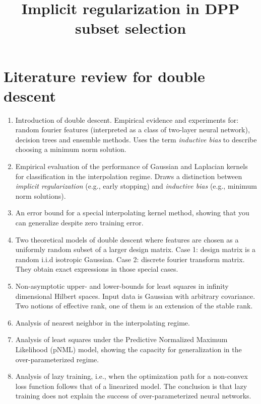 \documentclass[12pt]{sty/colt2019/colt2018-arxiv}
\title{Implicit regularization in DPP subset selection}
\begin{document}
\maketitle

\section{Literature review for double descent}

\begin{enumerate}
\item \citet*{BHMM19} Introduction of double descent. Empirical evidence and
experiments for: random fourier features (interpreted as a class of
two-layer neural network), decision trees and ensemble
methods. Uses the term \emph{inductive bias} to describe choosing a
minimum norm solution.

\item\citet*{BMM18_TR}
Empirical evaluation of the performance of Gaussian and Laplacian
kernels for classification in the interpolation regime. Draws a distinction between
\emph{implicit regularization} (e.g., early stopping) and
\emph{inductive bias} (e.g., minimum norm solutions).

\item\citet*{BRT18_TR}
An error bound for a special interpolating kernel
method, showing that you can generalize despite zero training error.

\item\citet*{belkin2019two} Two theoretical models of double
  descent where features are chosen as a uniformly random subset of a
  larger design matrix. Case 1: design matrix is a random i.i.d
  isotropic Gaussian. Case 2: discrete fourier transform matrix. They
  obtain exact expressions in those special cases.

\item \citet*{BLLT19_TR} Non-asymptotic upper- and lower-bounds for
  least squares in infinity dimensional Hilbert spaces. Input data is
  Gaussian with arbitrary covariance. Two notions of
 effective rank, one of them is an extension of the stable rank.


\item \citet*{BHM18_TR} Analysis of nearest neighbor in the
   interpolating regime.

 \item \citet*{BFF19_TR} Analysis of least squares
   under the Predictive Normalized Maximum Likelihood (pNML) model,
   showing the capacity for generalization in the over-parameterized
   regime.
 \item \citet*{COB18_TR} Analysis of lazy training, i.e., when the
   optimization path for a non-convex loss function follows
   that of a linearized model. The conclusion is that lazy training
   does not explain the success of over-parameterized neural networks.


\end{enumerate}
\end{document}
